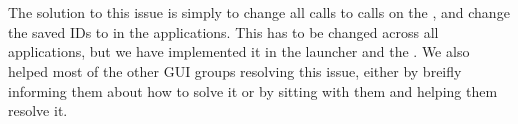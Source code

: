 \\\\
The solution to this issue is simply to change all  calls to  calls on the , and change the saved IDs to  in the applications. This has to be changed across all applications, but we have implemented it in the launcher and the \ct. We also helped most of the other GUI groups resolving this issue, either by breifly informing them about how to solve it or by sitting with them and helping them resolve it.  

